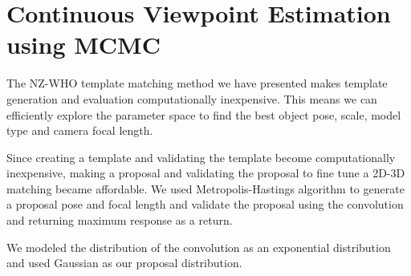 \documentclass[10pt,twocolumn,letterpaper]{article}
\begin{document}
%   
% 
% 
% 


\section{Continuous Viewpoint Estimation using MCMC}
\label{sec:fine}
The NZ-WHO template matching method we have presented makes template generation
and evaluation computationally inexpensive. This means we can efficiently
explore the parameter space to find the best object pose, scale, model type and
camera focal length.

Since creating a template and validating the template become computationally
inexpensive, making a proposal and validating the proposal to fine tune a 2D-3D
matching became affordable. We used Metropolis-Hastings algorithm to generate a
proposal pose and focal length and validate the proposal using the convolution
and returning maximum response as a return.

We modeled the distribution of the convolution as an exponential distribution
and used Gaussian as our proposal distribution.  
\end{document}
